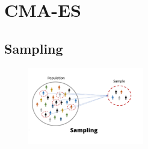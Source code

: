 \documentclass{book}
\begin{document}
\section{CMA-ES}
\subsection{Sampling}
\begin{figure}[H]
    \centering
    \includegraphics[width=0.45\textwidth]{images/sampling.png}
\end{figure}
\end{document}
